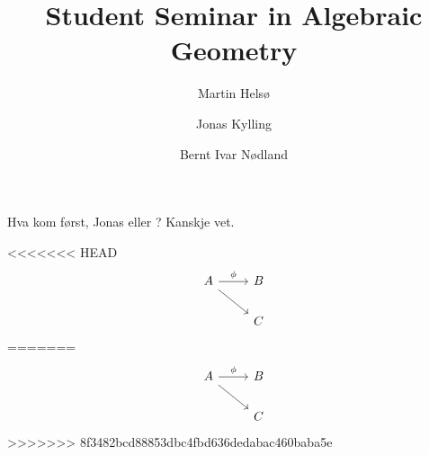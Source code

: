 \documentclass[a4paper, UKenglish]{report}
\title
{
    \bfseries\sffamily
    Student Seminar in Algebraic Geometry
}
\author
{
    Martin Hels\o
    \and
    Jonas Kylling
    \and 
    Bernt Ivar N\o dland
}
\begin{document}
\begin{titlepage}
    \maketitle
\end{titlepage}

\noindent Hva kom først, Jonas eller \kern-7pt \egg ? Kanskje \cite{Huy06} vet.

<<<<<<< HEAD
\[
\begin{tikzcd}
  A \arrow[rd] \arrow [r, "\phi"] & B \\
  & C
\end{tikzcd}
\]
=======
\begin{equation}
    \begin{tikzcd}
        A \arrow[rd] \arrow [r, "\phi"] & B \\
                                        & C
    \end{tikzcd}
\end{equation}
>>>>>>> 8f3482bcd88853dbc4fbd636dedabac460baba5e

\clearpage
\printbibliography
\end{document}
